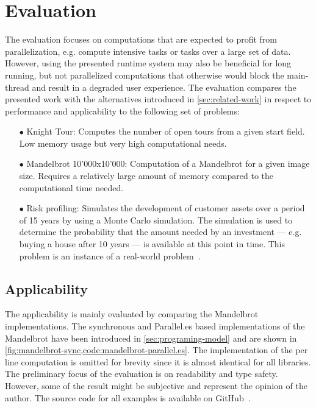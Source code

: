 \section{Evaluation}\label{sec:evaluation}
The evaluation focuses on computations that are expected to profit from parallelization, e.g. compute intensive tasks or tasks over a large set of data. However, using the presented runtime system may also be beneficial for long running, but not parallelized computations that otherwise would block the main-thread and result in a degraded user experience. The evaluation compares the presented work with the alternatives introduced in \cref{sec:related-work} in respect to performance and applicability to the following set of problems:

\begin{itemize}
	\item[$\bullet$] Knight Tour: Computes the number of open tours from a given start field. Low memory usage but very high computational needs.
	\item[$\bullet$] Mandelbrot 10'000x10'000: Computation of a Mandelbrot for a given image size. Requires a relatively large amount of memory compared to the computational time needed.
	\item[$\bullet$] Risk profiling: Simulates the development of customer assets over a period of 15 years by using a Monte Carlo simulation. The simulation is used to determine the probability that the amount needed by an investment --- e.g. buying a house after 10 years --- is available at this point in time. This problem is an instance of a real-world problem~\cite{Kwsoft2016}.
\end{itemize}


\subsection{Applicability}
The applicability is mainly evaluated by comparing the Mandelbrot implementations. The synchronous and Parallel.es based implementations of the Mandelbrot have been introduced in \cref{sec:programing-model} and are shown in \cref{fig:mandelbrot-sync,code:mandelbrot-parallel.es}. The implementation of the per line computation is omitted for brevity since it is almost identical for all libraries. The preliminary focus of the evaluation is on readability and type safety. However, some of the result might be subjective and represent the opinion of the author. The source code for all examples is available on GitHub~\cite{Reiser2016}. 

